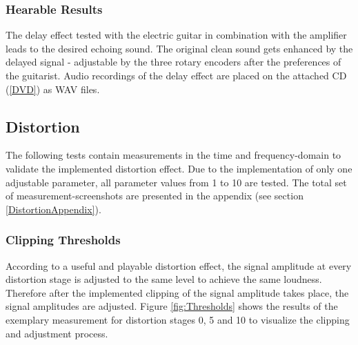 \subsubsection{Hearable Results}

The delay effect tested with the electric guitar in combination with the amplifier leads to the desired echoing sound. The original clean sound gets enhanced by the delayed signal - adjustable by the three rotary encoders after the preferences of the guitarist.
Audio recordings of the delay effect are placed on the attached CD\,(\ref{DVD}) as WAV files.


\subsection{Distortion}\label{cap:TestDistortion}

The following tests contain measurements in the time and frequency-domain to validate the implemented distortion effect. Due to the implementation of only one adjustable parameter, all parameter values from 1 to 10 are tested.
The total set of measurement-screenshots are presented in the appendix (see section \ref{DistortionAppendix}).


\subsubsection{Clipping Thresholds}


According to a useful and playable distortion effect, the signal amplitude at every distortion stage is adjusted to the same level to achieve the same loudness. 
Therefore after the implemented clipping of the signal amplitude takes place, the signal amplitudes are adjusted.
Figure \ref{fig:Thresholds} shows the results of the exemplary measurement for distortion stages 0, 5 and 10 to visualize the clipping and adjustment process.


